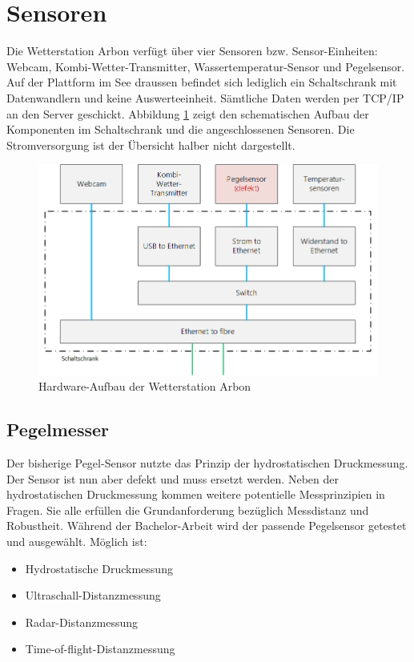 \section{Sensoren}
Die Wetterstation Arbon verfügt über vier Sensoren bzw. Sensor-Einheiten: Webcam, Kombi-Wetter-Transmitter, Wassertemperatur-Sensor und Pegelsensor. Auf der Plattform im See draussen befindet sich lediglich ein Schaltschrank mit Datenwandlern und keine Auswerteeinheit. Sämtliche Daten werden per TCP/IP an den Server geschickt. Abbildung \ref{img:schaltschrank} zeigt den schematischen Aufbau der Komponenten im Schaltschrank und die angeschlossenen Sensoren. Die Stromversorgung ist der Übersicht halber nicht dargestellt.

\begin{figure}[h]
	\centering
	\includegraphics[width=1\linewidth]{img/schaltschrank}
	\caption{Hardware-Aufbau der Wetterstation Arbon}
	\label{img:schaltschrank}
\end{figure}



\subsection{Pegelmesser}
Der bisherige Pegel-Sensor nutzte das Prinzip der hydrostatischen Druckmessung. Der Sensor ist nun aber defekt und muss ersetzt werden. Neben der hydrostatischen Druckmessung kommen weitere potentielle Messprinzipien in Fragen. Sie alle erfüllen die Grundanforderung bezüglich Messdistanz und Robustheit. Während der Bachelor-Arbeit wird der passende Pegelsensor getestet und ausgewählt. Möglich ist:

\begin{itemize}  
\item Hydrostatische Druckmessung
\item Ultraschall-Distanzmessung
\item Radar-Distanzmessung
\item Time-of-flight-Distanzmessung
\end{itemize}

